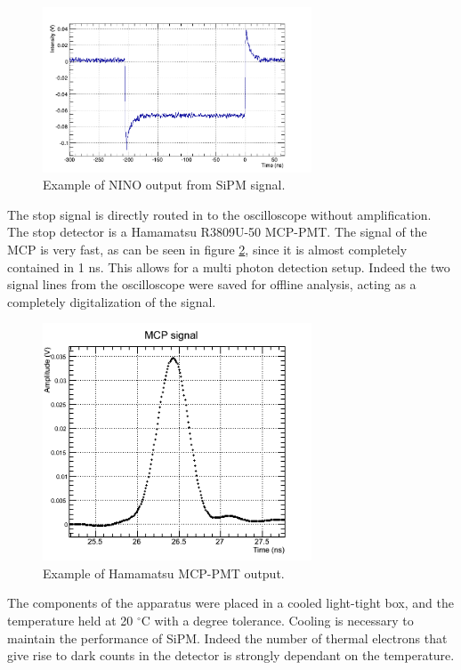 \begin{figure}[htbp]
\begin{center}
\includegraphics[width=8cm]{../Pictures/Chapter_8/NINO_signal.png}
\end{center}
\caption[NINO signal sample]{Example of NINO output from SiPM signal.}
\label{fig:NINO_sign}
\end{figure}
The stop signal is directly routed in to the oscilloscope without amplification. The stop detector is a Hamamatsu R3809U-50 MCP-PMT.
The signal of the MCP is very fast, as can be seen in figure \ref{fig:MCP_sign}, since it is almost completely contained in 1 ns. This allows for a multi photon detection setup.
Indeed the two signal lines from the oscilloscope were saved for offline analysis, acting as a completely digitalization of the signal.
\begin{figure}[htbp]
\begin{center}
\includegraphics[width=8cm]{../Pictures/Chapter_8/MCP_signal.png}
\end{center}
\caption[MCP signal sample]{Example of Hamamatsu MCP-PMT output.}
\label{fig:MCP_sign}
\end{figure}
The components of the apparatus were placed in a cooled light-tight box, and the temperature held at 20 $^{\circ}$C with a degree tolerance.
Cooling is necessary to maintain the performance of SiPM. Indeed the number of thermal electrons that give rise to dark counts in the detector is strongly dependant on the temperature.
